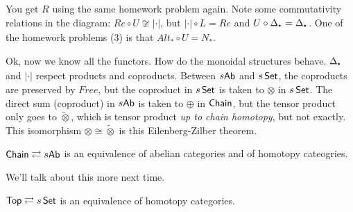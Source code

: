 You get $R$ using the same homework problem again. Note some commutativity relations in the diagram: $Re\circ U\not\cong |\cdot|$, but $|\cdot|\circ L=Re$ and $U\circ \Delta_\udot=\Delta_\udot$. One of the homework problems (3) is that $Alt_*\circ U=N_*$.

Ok, now we know all the functors. How do the monoidal structures behave. $\Delta_\udot$ and $|\cdot|$ respect products and coproducts. Between $s\text{\sf Ab}$ and $s\operatorname{\sf Set}$, the coproducts are preserved by $Free$, but the coproduct in $s\operatorname{\sf Set}$ is taken to $\otimes$ in $s\operatorname{\sf Set}$. The direct sum (coproduct) in $s\text{\sf Ab}$ is taken to $\oplus$ in $\text{\sf Chain}$, but the tensor product only goes to $\tilde \otimes$, which is tensor product \emph{up to chain homotopy}, but not exactly. This isomorphism $\otimes\cong \tilde\otimes$ is this Eilenberg-Zilber theorem.

\begin{theorem}
 $\text{\sf Chain} \rightleftarrows s\text{\sf Ab}$ is an equivalence of abelian categories and of homotopy cateogries.
\end{theorem}
We'll talk about this more next time.
\begin{theorem}[Quillen]
 $\text{\sf Top}\rightleftarrows s\operatorname{\sf Set}$ is an equivalence of homotopy categories.
\end{theorem}



